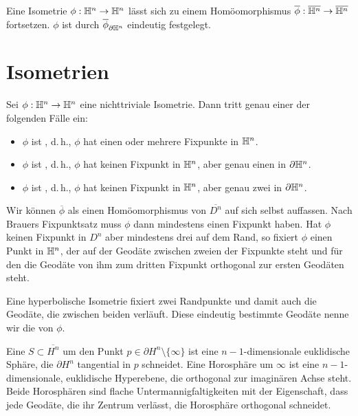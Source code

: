 \documentclass{book}
\begin{document}
\Lem{}
Eine Isometrie $\phi : \mathbb{H}^n \overset{}{\rightarrow} \mathbb{H}^n$ lässt sich zu einem Homöomorphismus $\overline{\phi} : \overline{\mathbb{H}^n} \overset{}{\rightarrow} \overline{\mathbb{H}^n} $ fortsetzen. $\phi$ ist durch $\overline{\phi}_{\partial \mathbb{H}^n}$ eindeutig festgelegt.

\section{Isometrien}
\Prop{}
Sei $\phi : \mathbb{H}^n \overset{}{\rightarrow} \mathbb{H}^n$ eine nichttriviale Isometrie. Dann tritt genau einer der folgenden Fälle ein:
\begin{itemize}
	\item $\phi$ ist , d.\,h., $\phi$ hat einen oder mehrere Fixpunkte in $\mathbb{H}^n$.
	\item $\phi$ ist , d.\,h., $\phi$ hat keinen Fixpunkt in $\mathbb{H}^n$, aber genau einen in $\partial \mathbb{H}^n$.
	\item $\phi$ ist , d.\,h., $\phi$ hat keinen Fixpunkt in $\mathbb{H}^n$, aber genau zwei in $\partial \mathbb{H}^n$.
\end{itemize}
\begin{Beweis}{}
Wir können $\overline{\phi}$ als einen Homöomorphismus von $\overline{D^n}$ auf sich selbst auffassen. Nach Brauers Fixpunktsatz muss $\phi$ dann mindestens einen Fixpunkt haben. Hat $\phi$ keinen Fixpunkt in $D^n$ aber mindestens drei auf dem Rand, so fixiert $\phi$ einen Punkt in $\mathbb{H}^n$, der auf der Geodäte zwischen zweien der Fixpunkte steht und für den die Geodäte von ihm zum dritten Fixpunkt orthogonal zur ersten Geodäten steht.
\end{Beweis}

\Def{}
Eine hyperbolische Isometrie fixiert zwei Randpunkte und damit auch die Geodäte, die zwischen beiden verläuft. Diese eindeutig bestimmte Geodäte nenne wir die  von $\phi$.

\Def{}
Eine  $S \subset \overline{H^n}$ um den Punkt $p \in \partial H^n\setminus\{\infty\}$ ist eine $n-1$-dimensionale euklidische Sphäre, die $\partial H^n$ tangential in $p$ schneidet. Eine Horosphäre um $\infty$ ist eine $n-1$-dimensionale, euklidische Hyperebene, die orthogonal zur imaginären Achse steht.\\
Beide Horosphären sind flache Untermannigfaltigkeiten mit der Eigenschaft, dass jede Geodäte, die ihr Zentrum verlässt, die Horosphäre orthogonal schneidet.
\end{document}
